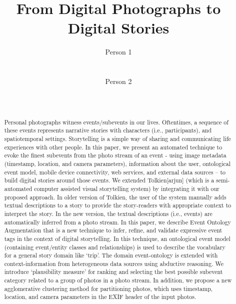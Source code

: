 \documentclass{sig-alternate}
\begin{document}
\title{From Digital Photographs to Digital Stories}

\author{
\alignauthor
Person 1\\
       \\
       \\
\alignauthor
Person 2\\
       \\
       \\
}


\maketitle
\begin{abstract}
Personal photographs witness events/subevents in our lives. Oftentimes, a sequence of these events represents narrative stories with characters (i.e., participants), and spatiotemporal settings. Storytelling is a simple way of sharing and communicating life experiences with other people. In this paper, we present an automated technique to evoke the finest subevents from the photo stream of an event - using image metadata (timestamp, location, and camera parameters), information about the user, ontological event model, mobile device connectivity, web services, and external data sources – to build digital stories around those events. We extended Tolkien[arjun] (which is a semi-automated computer assisted visual storytelling system) by integrating it with our proposed approach. In older version of Tolkien, the user of the system manually adds textual descriptions to a story to provide the story-readers with appropriate context to interpret the story. In the new version, the textual descriptions (i.e., events) are automatically inferred from a photo stream. In this paper, we describe Event Ontology Augmentation that is a new technique to infer, refine, and validate expressive event tags in the context of digital storytelling. In this technique, an ontological event model (containing event/entity classes and relationships) is used to describe the vocabulary for a general story domain like ‘trip’. The domain event-ontology is extended with context-information from heterogeneous data sources using abductive reasoning. We introduce ‘plausibility measure’ for ranking and selecting the best possible subevent category related to a group of photos in a photo stream. In addition, we propose a new agglomerative clustering method for partitioning photos, which uses timestamp, location, and camera parameters in the EXIF header of the input photos. 
\end{abstract}
\end{document}

